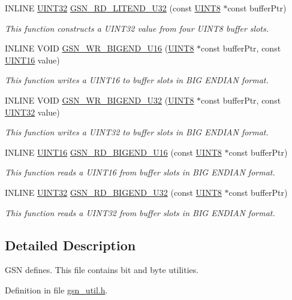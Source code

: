 \begin{DoxyCompactItemize}
INLINE \hyperlink{a00660_gae1e6edbbc26d6fbc71a90190d0266018}{UINT32} \hyperlink{a00634_gaa66275afb4728d1a19813412f1867b38}{GSN\_\-RD\_\-LITEND\_\-U32} (const \hyperlink{a00660_gab27e9918b538ce9d8ca692479b375b6a}{UINT8} $\ast$const bufferPtr)
\begin{DoxyCompactList}\small\item\em This function constructs a UINT32 value from four UINT8 buffer slots. \end{DoxyCompactList}\item 
INLINE VOID \hyperlink{a00634_ga33948c00f14501bc1db7b052d0c5f349}{GSN\_\-WR\_\-BIGEND\_\-U16} (\hyperlink{a00660_gab27e9918b538ce9d8ca692479b375b6a}{UINT8} $\ast$const bufferPtr, const \hyperlink{a00660_ga09f1a1fb2293e33483cc8d44aefb1eb1}{UINT16} value)
\begin{DoxyCompactList}\small\item\em This function writes a UINT16 to buffer slots in BIG ENDIAN format. \end{DoxyCompactList}\item 
INLINE VOID \hyperlink{a00634_ga60ab53941c9f097c11682045248d549d}{GSN\_\-WR\_\-BIGEND\_\-U32} (\hyperlink{a00660_gab27e9918b538ce9d8ca692479b375b6a}{UINT8} $\ast$const bufferPtr, const \hyperlink{a00660_gae1e6edbbc26d6fbc71a90190d0266018}{UINT32} value)
\begin{DoxyCompactList}\small\item\em This function writes a UINT32 to buffer slots in BIG ENDIAN format. \end{DoxyCompactList}\item 
INLINE \hyperlink{a00660_ga09f1a1fb2293e33483cc8d44aefb1eb1}{UINT16} \hyperlink{a00634_ga56b3884cf803598729efac09feda672e}{GSN\_\-RD\_\-BIGEND\_\-U16} (const \hyperlink{a00660_gab27e9918b538ce9d8ca692479b375b6a}{UINT8} $\ast$const bufferPtr)
\begin{DoxyCompactList}\small\item\em This function reads a UINT16 from buffer slots in BIG ENDIAN format. \end{DoxyCompactList}\item 
INLINE \hyperlink{a00660_gae1e6edbbc26d6fbc71a90190d0266018}{UINT32} \hyperlink{a00634_gae9bb82c2969564282b416ad9981dc542}{GSN\_\-RD\_\-BIGEND\_\-U32} (const \hyperlink{a00660_gab27e9918b538ce9d8ca692479b375b6a}{UINT8} $\ast$const bufferPtr)
\begin{DoxyCompactList}\small\item\em This function reads a UINT32 from buffer slots in BIG ENDIAN format. \end{DoxyCompactList}\end{DoxyCompactItemize}


\subsection{Detailed Description}
GSN defines. This file contains bit and byte utilities. 

Definition in file \hyperlink{a00602_source}{gsn\_\-util.h}.

